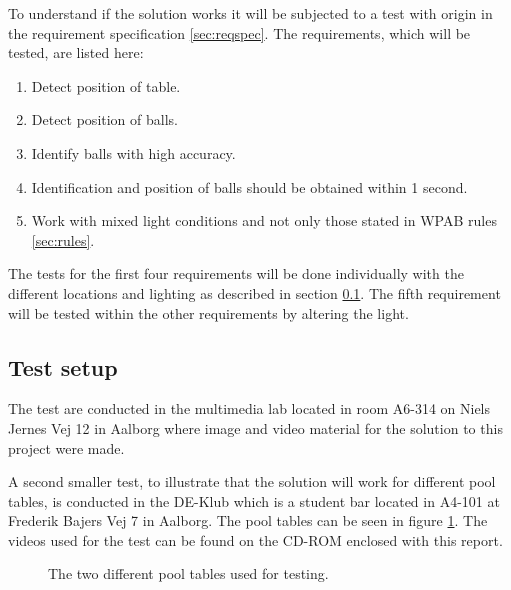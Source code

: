 To understand if the solution works it will be subjected to a test with origin in the requirement specification \ref{sec:reqspec}. The requirements, which will be tested, are listed here:

\begin{enumerate}
\setlength{\itemsep}{0mm}
	\item Detect position of table.
	\item Detect position of balls.
	\item Identify balls with high accuracy.
	\item Identification and position of balls should be obtained within 1 second.
	\item Work with mixed light conditions and not only those stated in WPAB rules \ref{sec:rules}.
\end{enumerate}

The tests for the first four requirements will be done individually with the different locations and lighting as described in section \ref{sec:testsetup}. The fifth requirement will be tested within the other requirements by altering the light.

\subsection{Test setup}
\label{sec:testsetup}
The test are conducted in the multimedia lab located in room A6-314 on Niels Jernes Vej 12 in Aalborg where image and video material for the solution to this project were made. 

A second smaller test, to illustrate that the solution will work for different pool tables, is conducted in the DE-Klub which is a student bar located in A4-101 at Frederik Bajers Vej 7 in Aalborg. The pool tables can be seen in figure \ref{fig:diffpool}. The videos used for the test can be found on the CD-ROM enclosed with this report.

\begin{figure}[H]
  \centering
  \quad           
   \caption{The two different pool tables used for testing.}
  \label{fig:diffpool}
\end{figure}

